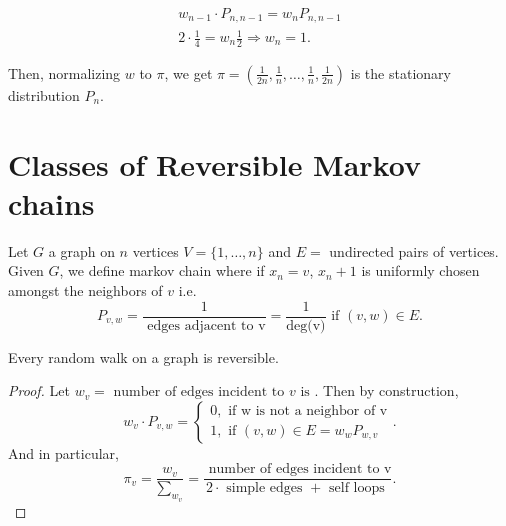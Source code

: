\documentclass[a4paper]{article}
\begin{document}
\begin{align*}
 w_{n-1} \cdot P_{n,n-1} = w_n P_{n,n-1} \\
 2 \cdot \frac{1}{4} = w_n \frac{1}{2}  \Rightarrow w_n = 1
.\end{align*}

Then, normalizing $w$ to  $\pi$, we get $\pi = \left( \frac{1}{2n}, \frac{1}{n}, \ldots, \frac{1}{n}, \frac{1}{2n} \right) $ is the stationary distribution $P_n$.

\section{Classes of Reversible Markov chains}
\begin{definition}
  Let $G$ a graph on  $n$ vertices  $V = \{1,\ldots,n\} $ and $E=$ undirected pairs of vertices. Given $G$, we define markov chain where if $x_n = v$,  $x_n+1$ is uniformly chosen amongst the neighbors of  $v$ i.e.
   \[
  P_{v,w} = \frac{1}{\text{ edges adjacent to v}} = \frac{1}{\text{deg(v)}} \text{ if } (v,w) \in E
  .\]
\end{definition}

\begin{prop}
  Every random walk on a graph is reversible. 

  \begin{proof}
    Let $w_v = \text{ number of edges incident to $v$ is }$. Then by construction,
    \[
    w_v \cdot P_{v,w} = \begin{cases}
      0, \text{ if  w is not a neighbor of v}\\
      1, \text{ if $(v,w) \in E$} = w_w P_{w,v}
    \end{cases}
    .\] 
    And in particular,
    \[
     \pi_{v} = \frac{w_v}{\sum_{w_v}} = \frac{\text{ number of edges incident to v}}{2 \cdot \text{ simple edges } + \text{ self loops }}
    .\] 
  \end{proof}
\end{prop}
\end{document}

